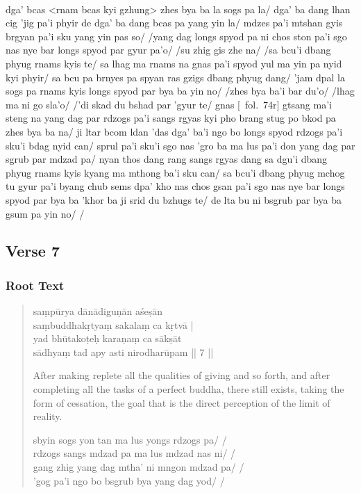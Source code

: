 \documentclass[12pt]{article}
\begin{document}
\textbf{\TVB}\\
dga' bcas <rnam bcas kyi gzhung> zhes bya ba la sogs pa la/ dga' ba dang lhan cig 'jig pa'i phyir de dga' ba dang bcas pa yang yin la/ mdzes pa'i mtshan gyis brgyan pa'i sku yang yin pas so/ /yang dag longs spyod pa ni chos ston pa'i sgo nas nye bar longs spyod par gyur pa'o/ /su zhig gis zhe na/ /sa bcu'i dbang phyug rnams kyis te/ sa lhag ma rnams na gnas pa'i spyod yul ma yin pa nyid kyi phyir/ sa bcu pa brnyes pa spyan ras gzigs dbang phyug dang/ 'jam dpal la sogs pa rnams kyis longs spyod par bya ba yin no/ /zhes bya ba'i bar du'o/ /lhag ma ni go sla'o/ /'di skad du bshad par 'gyur te/ gnas [\TVB\ fol.\ 74r] gtsang ma'i steng na yang dag par rdzogs pa'i sangs rgyas kyi pho brang stug po bkod pa zhes bya ba na/ ji ltar bcom ldan 'das dga' ba'i ngo bo longs spyod rdzogs pa'i sku'i bdag nyid can/ sprul pa'i sku'i sgo nas 'gro ba ma lus pa'i don yang dag par sgrub par mdzad pa/ nyan thos dang rang sangs rgyas dang sa dgu'i dbang phyug rnams kyis kyang ma mthong ba'i sku can/ sa bcu'i dbang phyug mchog tu gyur pa'i byang chub sems dpa' kho nas chos gsan pa'i sgo nas nye bar longs spyod par bya ba 'khor ba ji srid du bzhugs te/ de lta bu ni bsgrub par bya ba gsum pa yin no/ /

\subsection{Verse 7}
\subsubsection{Root Text}
\begin{quote}
	saṃpūrya dānādiguṇān aśeṣān \\
	saṃbuddhakṛtyaṃ\footnoteB{
		saṃbuddhakṛtyaṃ] \emd\ (\emph{cf.} TaRaA-V: saṃbuddhānāṃ \ldots\ avaśyakartavyaṃ kṛtsnaṃ); saṃbuddhya kṛtyaṃ \MS\ \EDD
	} sakalaṃ ca kṛtvā |\\
	yad bhūtakoṭeḥ karaṇaṃ ca sākṣāt \\
	sādhyaṃ tad apy asti nirodharūpam || 7 ||

	After making replete all the qualities of giving and so forth, and after completing all the tasks of a perfect buddha, there still exists, taking the form of cessation, the goal that is the direct perception of the limit of reality.

	sbyin sogs yon tan ma lus yongs rdzogs pa/ /\\
	rdzogs sangs mdzad pa ma lus mdzad nas ni/ /\\
	gang zhig yang dag mtha' ni mngon mdzad pa/ /\\
	'gog pa'i ngo bo bsgrub bya yang dag yod/ /
\end{quote}
\end{document}
